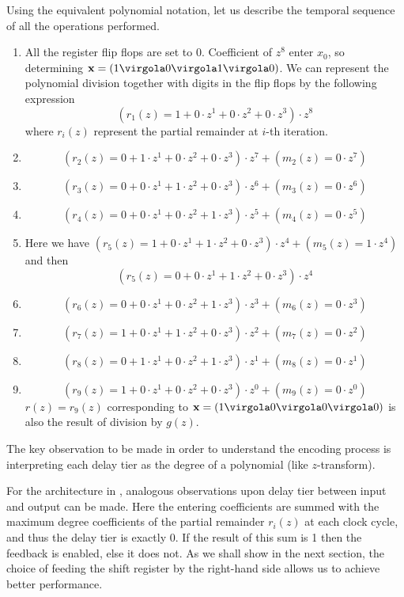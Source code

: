 Using the equivalent polynomial notation, let us describe the temporal sequence of all the operations performed.
\begin{enumerate}
\item All the register flip flops are set to 0. Coefficient of \(z^8\) enter \(x_0\), so determining \(\vet x =  (1\virgola0\virgola1\virgola0)\). We can represent the polynomial division together with digits in the flip flops by the following expression
    \[ (r_{1}(z)=1+0\cdot z^1+0\cdot z^2+0\cdot z^3)\cdot z^8\]
    where \(r_{i}(z)\) represent the partial remainder at \(i\)-th iteration.

\item \[(r_{2}(z)=0+1\cdot z^1+0\cdot z^2+0\cdot z^3)\cdot z^7 + (m_2(z) = 0\cdot z^7)\]
\item \[(r_{3}(z)=0+0\cdot z^1+1\cdot z^2+0\cdot z^3)\cdot z^6 + (m_3(z) = 0\cdot z^6)\]
\item \[(r_{4}(z)=0+0\cdot z^1+0\cdot z^2+1\cdot z^3)\cdot z^5 + (m_4(z) = 0\cdot z^5)\]
\item Here we have \((r_{5}(z)=1+0\cdot z^1+1\cdot z^2+0\cdot z^3)\cdot z^4 + (m_5(z) = 1\cdot z^4)\) and then
    \[
    (r_{5}(z)=0+0\cdot z^1+1\cdot z^2+0\cdot z^3)\cdot z^4
    \]
\item
\[(r_{6}(z)=0+0\cdot z^1+0\cdot z^2+1\cdot z^3)\cdot z^3 + (m_6(z) = 0\cdot z^3)\]
\item
\[(r_{7}(z)=1+0\cdot z^1+1\cdot z^2+0\cdot z^3)\cdot z^2+ (m_7(z) = 0\cdot z^2)\]
\item
\[(r_{8}(z)=0+1\cdot z^1+0\cdot z^2+1\cdot z^3)\cdot z^1+ (m_8(z) = 0\cdot z^1)\]
\item
\[(r_{9}(z)=1+0\cdot z^1+0\cdot z^2+0\cdot z^3)\cdot z^0+ (m_9(z) = 0\cdot z^0)\]
\(r(z)=r_9(z)\) corresponding to \(\vet x=(1\virgola0\virgola0\virgola0)\) is also the result of division by \(g(z)\).
\end{enumerate}
The key observation to be made in order to understand the encoding process is interpreting each delay tier as the degree of a polynomial (like \(z\)-transform).

For the architecture in , analogous observations upon delay tier between input and output can be made. Here the entering coefficients are summed with the maximum degree coefficients of the partial remainder \(r_{i}(z)\) at each clock cycle, and thus the delay tier is exactly 0. If the result of this sum is 1 then the feedback is enabled, else it does not. As we shall show in the next section, the choice of feeding the shift register by the right-hand side allows us to achieve better performance.

